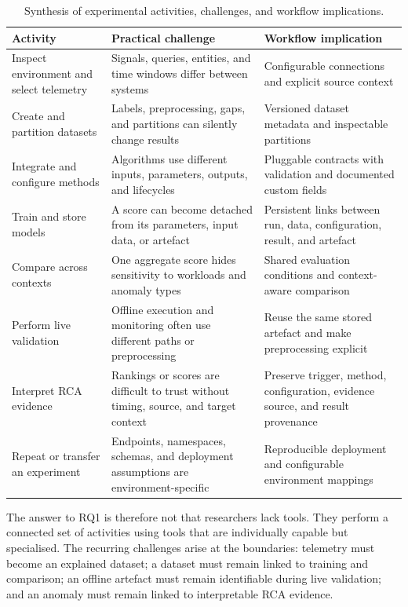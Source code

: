 \begin{table}[H]
    \centering
    \small
    \caption{Synthesis of experimental activities, challenges, and workflow implications.}
    \label{tab:rq1-synthesis}
    \begin{tabularx}{\textwidth}{p{3.0cm} X X}
        \toprule
        Activity & Practical challenge & Workflow implication \\
        \midrule
        Inspect environment and select telemetry & Signals, queries, entities, and time windows differ between systems & Configurable connections and explicit source context \\
        Create and partition datasets & Labels, preprocessing, gaps, and partitions can silently change results & Versioned dataset metadata and inspectable partitions \\
        Integrate and configure methods & Algorithms use different inputs, parameters, outputs, and lifecycles & Pluggable contracts with validation and documented custom fields \\
        Train and store models & A score can become detached from its parameters, input data, or artefact & Persistent links between run, data, configuration, result, and artefact \\
        Compare across contexts & One aggregate score hides sensitivity to workloads and anomaly types & Shared evaluation conditions and context-aware comparison \\
        Perform live validation & Offline execution and monitoring often use different paths or preprocessing & Reuse the same stored artefact and make preprocessing explicit \\
        Interpret RCA evidence & Rankings or scores are difficult to trust without timing, source, and target context & Preserve trigger, method, configuration, evidence source, and result provenance \\
        Repeat or transfer an experiment & Endpoints, namespaces, schemas, and deployment assumptions are environment-specific & Reproducible deployment and configurable environment mappings \\
        \bottomrule
    \end{tabularx}
\end{table}

The answer to RQ1 is therefore not that researchers lack tools. They perform a connected set of activities using tools that are individually capable but specialised. The recurring challenges arise at the boundaries: telemetry must become an explained dataset; a dataset must remain linked to training and comparison; an offline artefact must remain identifiable during live validation; and an anomaly must remain linked to interpretable RCA evidence.

